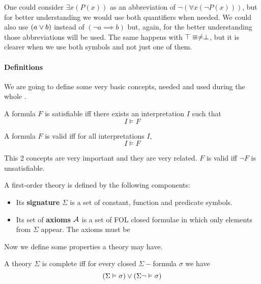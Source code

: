One could consider $\exists x(P(x))$  as an abbreviation of $\neg (\forall x(\neg P(x)))$, but for better understanding we would use both quantifiers when needed.
We could also use $(a \vee b)$ instead of $(\neg a \implies b)$ but, again, for the better understanding those abbreviations will be used.
The same happens with $\top \equiv \neq \perp$, but it is clearer when we use both symbols and not just one of them.


\paragraph{Definitions}

We are going to define some very basic concepts, needed and used during the whole \thisworkm.

\begin{defn}[Satisfiability]

A formula $F$ is satisfiable \gls{iff} there exists an interpretation $I$ such that \[I \vDash F\]
\end{defn}

\begin{defn}[Validity]

A formula $F$ is valid \gls{iff} for all interpretations $I$, \[I\vDash F\]
\end{defn}
\label{def:validity}
This 2 concepts are very important and they are very related. $F$ is valid \gls{iff} $\neg F$ is unsatisfiable. 

\begin{defn}[Theory]

A first-order theory is defined by the following components: 
\begin{itemize}
	\item Its \textbf{signature} $\Sigma$ is a set of constant, function and predicate symbols.
	\item Its set of \textbf{axioms} $\mathcal{A}$ is a set of \gls{FOL} closed formulae in which only elements from $\Sigma$ appear.
	\subitem The axioms must be 
\end{itemize}
\end{defn}

Now we define some properties a theory may have.

\begin{defn}[Completeness]

	A theory $\Sigma$ is complete \gls{iff} for every closed $\Sigma-$formula $\sigma$ we have \[(\Sigma\vDash \sigma) \vee (\Sigma\neg\vDash \sigma) \] 
\end{defn}

